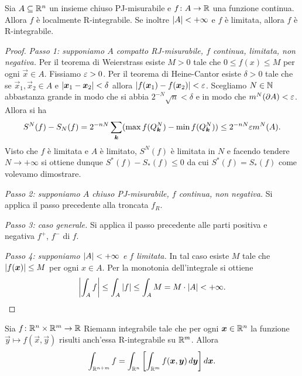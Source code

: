 \begin{theorem}
Sia $A\subseteq {\mathbb R}^n$ un insieme chiuso PJ-misurabile e $f\colon A \to {\mathbb R}$ una funzione 
continua. Allora $f$ è localmente R-integrabile. 
Se inoltre ${\left|A\right|}<+\infty$ e $f$ 
è limitata, allora $f$ è R-integrabile.
\end{theorem}
%
\begin{proof}
\emph{Passo 1: supponiamo $A$ compatto RJ-misurabile, 
$f$ continua, limitata, non negativa.}
Per il teorema di Weierstrass esiste $M>0$ tale che $0\le f(x) \le M$ per 
ogni $\vec x \in A$.
Fissiamo $\varepsilon>0$.
Per il teorema di Heine-Cantor esiste $\delta>0$ tale 
che se $\vec x_1,\vec x_2\in A$ e ${\left|\boldsymbol x_1 -\boldsymbol x_2\right|}<\delta$ 
allora ${\left|f(\boldsymbol x_1)-f(\boldsymbol x_2)\right|}< \varepsilon$. 
Scegliamo $N\in {\mathbb N}$ abbastanza grande in modo che si abbia $2^{-N}\sqrt n < \delta$
e in modo che $m^N(\partial A)<\varepsilon$.
Allora si ha
\[
  S^N(f) - S_N(f) 
  = 2^{-nN}\sum_{\boldsymbol k} (\max f(Q^N_{\boldsymbol k})-\min f(Q^N_{\boldsymbol k})) 
  \le 2^{-nN}\varepsilon m^N(A).
\]
Visto che $f$ è limitata e $A$ è limitato, $S^N(f)$ è limitata in $N$ 
e facendo tendere $N\to+\infty$ si ottiene 
dunque $S^*(f)-S_*(f) \le 0$ da cui $S^*(f)=S_*(f)$ come volevamo dimostrare.

\emph{Passo 2: supponiamo $A$ chiuso PJ-misurabile, $f$ continua, non negativa.} 
Si applica il passo precedente alla troncata $f_R$.

\emph{Passo 3: caso generale.}
Si applica il passo precedente alle parti 
positiva e negativa $f^+$, $f^-$ di $f$.

\emph{Passo 4: supponiamo ${\left|A\right|}<+\infty$ e $f$ limitata.}  
In tal caso esiste $M$ tale che ${\left|f(\boldsymbol x)\right|}\le M$ per 
ogni $x\in A$. 
Per la monotonia dell'integrale si ottiene 
\[
  {\left|\int_A f\right|} 
  \le \int_A {\left|f\right|}
  \le \int_A M = M \cdot {\left|A\right|} < +\infty.  
\]
\end{proof}

\begin{theorem}
Sia $f\colon {\mathbb R}^n\times {\mathbb R}^m \to {\mathbb R}$ Riemann integrabile
tale che per ogni $\boldsymbol x\in {\mathbb R}^n$ la funzione $\vec y \mapsto f(\vec x,\vec y)$ 
risulti anch'essa R-integrabile su ${\mathbb R}^m$.
Allora 
\[
  \int_{{\mathbb R}^{n+m}} f = \int_{{\mathbb R}^n} {\left[ \int_{{\mathbb R}^m} f(\boldsymbol x, \boldsymbol y)\, d\boldsymbol y \right]}\, d\boldsymbol x.
\]
\end{theorem}

